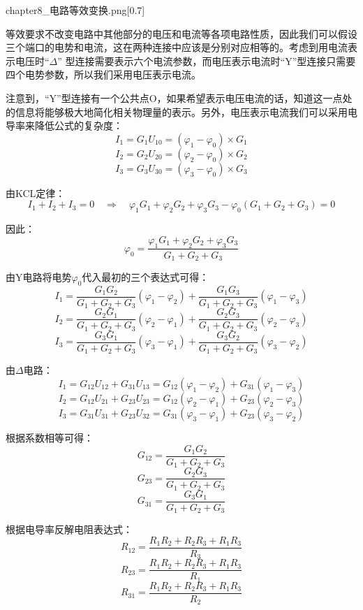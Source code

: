 \begin{prove}[Y-$\Delta$等效]
    \begin{singlefigure}{chapter8_电路等效变换.png}[0.7]
    \end{singlefigure}

    等效要求不改变电路中其他部分的电压和电流等各项电路性质，因此我们可以假设三个端口的电势和电流，这在两种连接中应该是分别对应相等的。考虑到用电流表示电压时“$\Delta$”
    型连接需要表示六个电流参数，而电压表示电流时“Y”型连接只需要四个电势参数，所以我们采用电压表示电流。

    注意到，“Y”型连接有一个公共点O，如果希望表示电压电流的话，知道这一点处的信息将能够极大地简化相关物理量的表示。另外，电压表示电流我们可以采用电导率来降低公式的复杂度：
    \[ I_1 = G_1U_{10} = (\varphi_1 - \varphi_0) \times G_1 \]
    \[ I_2 = G_2U_{20} = (\varphi_2 - \varphi_0) \times G_2 \]
    \[ I_3 = G_3U_{30} = (\varphi_3 - \varphi_0) \times G_3 \]

    由KCL定律：
    \[ I_1 + I_2 + I_3 = 0\quad\Rightarrow\quad \varphi_1G_1 + \varphi_2G_2 + \varphi_3G_3 - \varphi_0(G_1 + G_2 + G_3) = 0 \]

    因此：
    \[ \varphi_0 = \dfrac{\varphi_1G_1 + \varphi_2G_2 + \varphi_3G_3}{G_1 + G_2 + G_3} \]

    由Y电路将电势$\varphi_0$代入最初的三个表达式可得：
    \[ I_1 = \dfrac{G_1G_2}{G_1 + G_2 + G_3} (\varphi_1 - \varphi_2) + \dfrac{G_1G_3}{G_1 + G_2 + G_3} (\varphi_1 - \varphi_3) \]
    \[ I_2 = \dfrac{G_2G_1}{G_1 + G_2 + G_3} (\varphi_2 - \varphi_1) + \dfrac{G_2G_3}{G_1 + G_2 + G_3} (\varphi_2 - \varphi_3) \]
    \[ I_3 = \dfrac{G_3G_1}{G_1 + G_2 + G_3} (\varphi_3 - \varphi_1) + \dfrac{G_3G_2}{G_1 + G_2 + G_3} (\varphi_3 - \varphi_2) \]

    由$\Delta$电路：
    \[ I_1 = G_{12}U_{12} + G_{31}U_{13} = G_{12}(\varphi_1 - \varphi_2) + G_{31}(\varphi_1 - \varphi_3) \]
    \[ I_2 = G_{12}U_{21} + G_{23}U_{23} = G_{12}(\varphi_2 - \varphi_1) + G_{23}(\varphi_2 - \varphi_3) \]
    \[ I_3 = G_{31}U_{31} + G_{23}U_{32} = G_{31}(\varphi_3 - \varphi_1) + G_{23}(\varphi_3 - \varphi_2) \]
    
    根据系数相等可得：
    \[ G_{12} = \dfrac{G_1G_2}{G_1 + G_2 + G_3} \]
    \[ G_{23} = \dfrac{G_2G_3}{G_1 + G_2 + G_3} \]
    \[ G_{31} = \dfrac{G_3G_1}{G_1 + G_2 + G_3} \]

    根据电导率反解电阻表达式：
    \[ R_{12} = \dfrac{R_1R_2 + R_2R_3 + R_1R_3}{R_3} \]
    \[ R_{23} = \dfrac{R_1R_2 + R_2R_3 + R_1R_3}{R_1} \]
    \[ R_{31} = \dfrac{R_1R_2 + R_2R_3 + R_1R_3}{R_2} \]


\end{prove}
